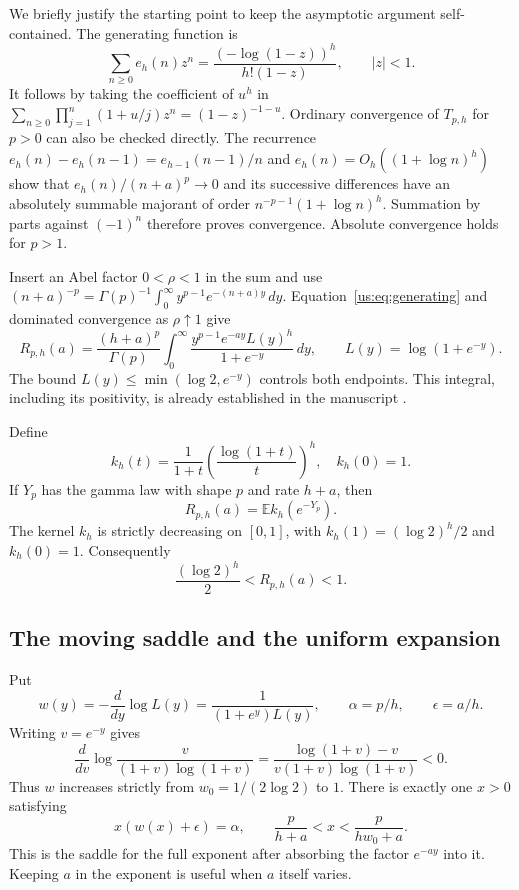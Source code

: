 \documentclass[11pt,a4paper]{article}
\numberwithin{equation}{section}
\theoremstyle{plain}
\theoremstyle{definition}
\theoremstyle{remark}
\newcommand{\src}[1]{\nolinkurl{#1}}
\begin{document}
We briefly justify the starting point to keep the asymptotic argument
self-contained. The generating function is
\begin{equation}\label{us:eq:generating}
 \sum_{n\ge0}e_h(n)z^n
 =\frac{(-\log(1-z))^h}{h!(1-z)},\qquad |z|<1.
\end{equation}
It follows by taking the coefficient of $u^h$ in
$\sum_{n\ge0}\prod_{j=1}^n(1+u/j)z^n=(1-z)^{-1-u}$.
Ordinary convergence of $T_{p,h}$ for $p>0$ can also be checked
directly. The recurrence
$e_h(n)-e_h(n-1)=e_{h-1}(n-1)/n$ and
$e_h(n)=O_h((1+\log n)^h)$ show that
$e_h(n)/(n+a)^p\to0$ and its successive differences have an
absolutely summable majorant of order
$n^{-p-1}(1+\log n)^h$. Summation by parts against $(-1)^n$
therefore proves convergence. Absolute convergence holds for $p>1$.

Insert an Abel factor $0<\rho<1$ in the sum and use
$(n+a)^{-p}=\Gamma(p)^{-1}\int_0^\infty y^{p-1}e^{-(n+a)y}\,dy$.
Equation~\eqref{us:eq:generating} and dominated convergence as
$\rho\uparrow1$ give
\begin{equation}\label{us:eq:integral}
 R_{p,h}(a)=\frac{(h+a)^p}{\Gamma(p)}
 \int_0^\infty
  \frac{y^{p-1}e^{-ay}L(y)^h}{1+e^{-y}}\,dy,
 \qquad L(y)=\log(1+e^{-y}).
\end{equation}
The bound $L(y)\le\min(\log2,e^{-y})$ controls both endpoints.
This integral, including its positivity, is already established in
the manuscript \cite[\src{chapters/04-depth.tex},
\src{chapters/04-proportional-depth.tex}]{cont:ProveIt}.

Define
\[
 k_h(t)=\frac1{1+t}\left(\frac{\log(1+t)}t\right)^h,
 \quad k_h(0)=1.
\]
If $Y_p$ has the gamma law with shape $p$ and rate $h+a$, then
\begin{equation}\label{us:eq:gamma}
 R_{p,h}(a)=\mathbb E k_h(e^{-Y_p}).
\end{equation}
The kernel $k_h$ is strictly decreasing on $[0,1]$, with
$k_h(1)=(\log2)^h/2$ and $k_h(0)=1$. Consequently
\begin{equation}\label{us:eq:bounds}
 \frac{(\log2)^h}{2}<R_{p,h}(a)<1.
\end{equation}

\subsection{The moving saddle and the uniform expansion}

Put
\[
 w(y)=-\frac{d}{dy}\log L(y)
     =\frac1{(1+e^y)L(y)},\qquad
 \alpha=p/h,\qquad \epsilon=a/h.
\]
Writing $v=e^{-y}$ gives
\[
 \frac{d}{dv}\log\frac{v}{(1+v)\log(1+v)}
 =\frac{\log(1+v)-v}{v(1+v)\log(1+v)}<0.
\]
Thus $w$ increases strictly from $w_0=1/(2\log2)$ to $1$.
There is exactly one $x>0$ satisfying
\begin{equation}\label{us:eq:saddle}
 x(w(x)+\epsilon)=\alpha,
 \qquad
 \frac{p}{h+a}<x<\frac{p}{hw_0+a}.
\end{equation}
This is the saddle for the full exponent after absorbing the
factor $e^{-ay}$ into it. Keeping $a$ in the exponent is useful when
$a$ itself varies.
\end{document}
